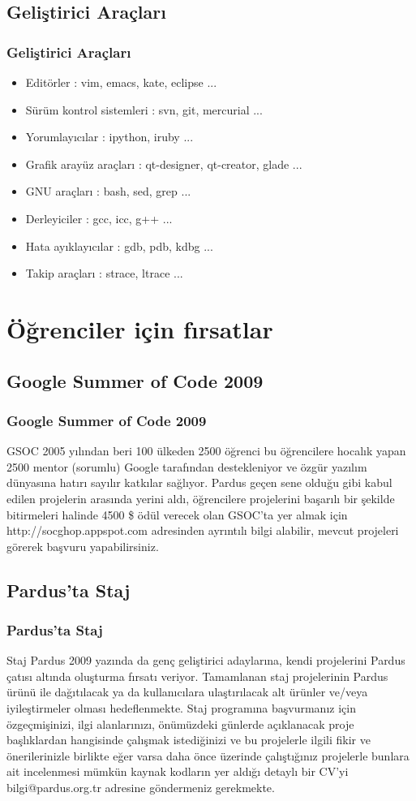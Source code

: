 \documentclass{beamer}
\begin{document}
\subsection{Geliştirici Araçları}
\frame
{
    \frametitle{Geliştirici Araçları}
	\begin{itemize}
        \item Editörler : vim, emacs, kate, eclipse ...
        \item Sürüm kontrol sistemleri : svn, git, mercurial ...
        \item Yorumlayıcılar : ipython, iruby ...
        \item Grafik arayüz araçları : qt-designer, qt-creator, glade ...
        \item GNU araçları : bash, sed, grep ...
        \item Derleyiciler : gcc, icc, g++ ...
        \item Hata ayıklayıcılar : gdb, pdb, kdbg ...
        \item Takip araçları : strace, ltrace ...
	\end{itemize}
}

\section{Öğrenciler için fırsatlar}

\subsection{Google Summer of Code 2009}
\frame
{
    \frametitle{Google Summer of Code 2009}
    \begin{block}{GSOC}
        2005 yılından beri 100 ülkeden 2500 öğrenci bu öğrencilere hocalık yapan 2500 mentor (sorumlu) Google tarafından destekleniyor ve özgür yazılım dünyasına hatırı sayılır katkılar sağlıyor. Pardus geçen sene olduğu gibi kabul edilen projelerin arasında yerini aldı, öğrencilere projelerini başarılı bir şekilde bitirmeleri halinde 4500 \$ ödül verecek olan GSOC'ta yer almak için http://socghop.appspot.com adresinden ayrıntılı bilgi alabilir, mevcut projeleri görerek başvuru yapabilirsiniz.
    \end{block}
}

\subsection{Pardus'ta Staj}
\frame
{
    \frametitle{Pardus'ta Staj}
    \begin{block}{Staj}
        Pardus 2009 yazında da genç geliştirici adaylarına, kendi projelerini Pardus çatısı altında oluşturma fırsatı veriyor. Tamamlanan staj projelerinin Pardus ürünü ile dağıtılacak ya da kullanıcılara ulaştırılacak alt ürünler ve/veya iyileştirmeler olması hedeflenmekte.
        Staj programına başvurmanız için özgeçmişinizi, ilgi alanlarınızı, önümüzdeki günlerde açıklanacak proje başlıklardan hangisinde çalışmak istediğinizi ve bu projelerle ilgili fikir ve önerilerinizle birlikte eğer varsa daha önce üzerinde çalıştığınız projelerle bunlara ait incelenmesi mümkün kaynak kodların yer aldığı detaylı bir CV'yi bilgi@pardus.org.tr adresine göndermeniz gerekmekte.
    \end{block}
}
\end{document}
